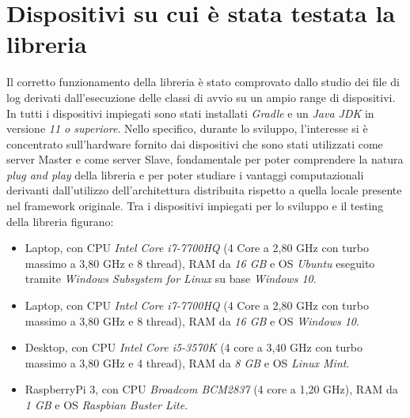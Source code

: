 \section{Dispositivi su cui è stata testata la libreria}
Il corretto funzionamento della libreria è stato comprovato dallo studio dei file di log derivati dall'esecuzione delle classi di avvio su un ampio range di dispositivi.
In tutti i dispositivi impiegati sono stati installati \emph{Gradle} e un \emph{Java JDK} in versione \emph{11 o superiore}.
Nello specifico, durante lo sviluppo, l'interesse si è concentrato sull'hardware fornito dai dispositivi che sono stati utilizzati come server Master e come server Slave, fondamentale per poter comprendere la natura \emph{plug and play} della libreria e per poter studiare i vantaggi computazionali derivanti dall'utilizzo dell'architettura distribuita rispetto a quella locale presente nel framework originale.
Tra i dispositivi impiegati per lo sviluppo e il testing della libreria figurano:

\begin{itemize}
    \item Laptop, con CPU \emph{Intel Core i7-7700HQ} (4 Core a 2,80 GHz con turbo massimo a 3,80 GHz e 8 thread), RAM da \emph{16 GB} e OS \emph{Ubuntu} eseguito tramite \emph{Windows Subsystem for Linux} su base \emph{Windows 10}.
    \item Laptop, con CPU \emph{Intel Core i7-7700HQ} (4 Core a 2,80 GHz con turbo massimo a 3,80 GHz e 8 thread), RAM da \emph{16 GB} e OS \emph{Windows 10}.
    \item Desktop, con CPU \emph{Intel Core i5-3570K} (4 core a 3,40 GHz con turbo massimo a 3,80 GHz e 4 thread), RAM da \emph{8 GB} e OS \emph{Linux Mint}.
    \item RaspberryPi 3, con CPU \emph{Broadcom BCM2837} (4 core a 1,20 GHz), RAM da \emph{1 GB} e OS \emph{Raspbian Buster Lite}.
\end{itemize}
